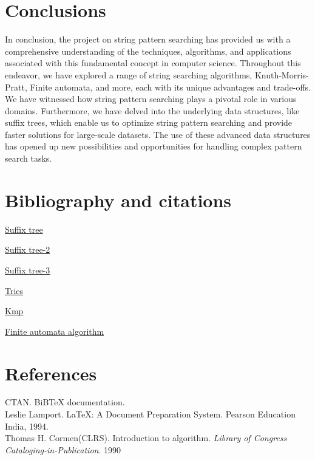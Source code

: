 \documentclass[11pt,a4paper]{article}
\begin{document}
\section{Conclusions}
\label{sec:conc}
In conclusion, the project on string pattern searching has provided us with a comprehensive understanding of the techniques, algorithms, and applications associated with this fundamental concept in computer science. Throughout this endeavor, we have explored a range of string searching algorithms, Knuth-Morris-Pratt, Finite automata, and more, each with its unique advantages and trade-offs. We have witnessed how string pattern searching plays a pivotal role in various domains. Furthermore, we have delved into the underlying data structures, like suffix trees, which enable us to optimize string pattern searching and provide faster solutions for large-scale datasets. The use of these advanced data structures has opened up new possibilities and opportunities for handling complex pattern search tasks.

\section{Bibliography and citations}
\label{sec:biblio}

\href{https://en.wikipedia.org/wiki/Suffix\_tree}{Suffix tree}

\href{https://www.geeksforgeeks.org/ukkonens-suffix-tree-construction-part-1/}{Suffix tree-2}

\href{https://www.geeksforgeeks.org/ukkonens-suffix-tree-construction-part-2/}{Suffix tree-3}

\href{https://www.geeksforgeeks.org/pattern-searching-using-trie-suffixes/}{Tries}

\href{https://www.geeksforgeeks.org/kmp-algorithm-for-pattern-searching/}{Kmp}

\href{https://www.geeksforgeeks.org/finite-automata-algorithm-for-pattern-searching/}{Finite automata algorithm}

\section{References}
\label{sec:refrnces}

CTAN. BiBTeX documentation.
\\
Leslie Lamport. LaTeX: A Document Preparation System. Pearson Education India, 1994.
\\
Thomas H. Cormen(CLRS). Introduction to algorithm.\emph{ Library of Congress Cataloging-in-Publication}. 1990
\end{document}
